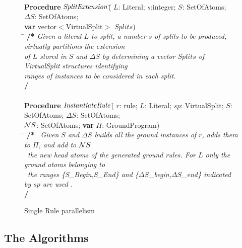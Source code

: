 \documentclass[preprint]{tlp}
\newcommand{\DNF}{\ensuremath{\Delta S}\xspace}
\newcommand{\NNF}{\ensuremath{{\cal N}S}\xspace}
\newcommand{\gpii}{\mbox{$\Pi$}}
\begin{document}
\begin{figure}[th!]
\begin{center}
\begin{small}
\begin{tabbing}
\\

{\bf Procedure} $\mathit{ SplitExtension \/}$(\= $L$: Literal; $s$:integer; $S$: SetOfAtoms; $\DNF$: SetOfAtoms; \\
\> {\bf var} vector$<$VirtualSplit$>$ $Splits$)\\
\hspace*{0.2cm} \= \kill
{\bf /*}
\>  {\em Given a literal $L$ to split, a number $s$ of splits to be produced, virtually partitions the extension}\\
\> { \em  of $L$ stored in $S$ and $\DNF$ by determining a vector $Splits$ of VirtualSplit structures identifying} \\
\>  {\em  ranges of instances to be considered in each split. }\\
{\bf */}
\\ \
\\
{\bf Procedure} $\mathit{ InstantiateRule \/}$(\= $r$: rule; $L$: Literal; $sp$: VirtualSplit; $S$: SetOfAtoms; $\DNF$: SetOfAtoms;\\
\>{\bf var} $\NNF$: SetOfAtoms; {\bf var} $\gpii$: GroundProgram)\\
\hspace*{0.2cm} \= \kill
{\bf /*}
\  {\em Given $S$ and $\DNF$ builds all the ground instances of $r$, adds them to $\Pi$, and add to $\NNF$ } \\
\> \ {\em  the new head atoms of the generated ground rules. For $L$ only the ground atoms belonging to }\\
\> \ {\em the ranges \{S\_Begin,S\_End\} and \{\DNF\_begin,\DNF\_end\} indicated by $sp$ are used  .}\\
{\bf */}
\end{tabbing}

\end{small}
\caption{Single Rule  parallelism}\label{fig:parallelInstantiation2}
\end{center}
\end{figure}



\subsection{The Algorithms}
\end{document}
